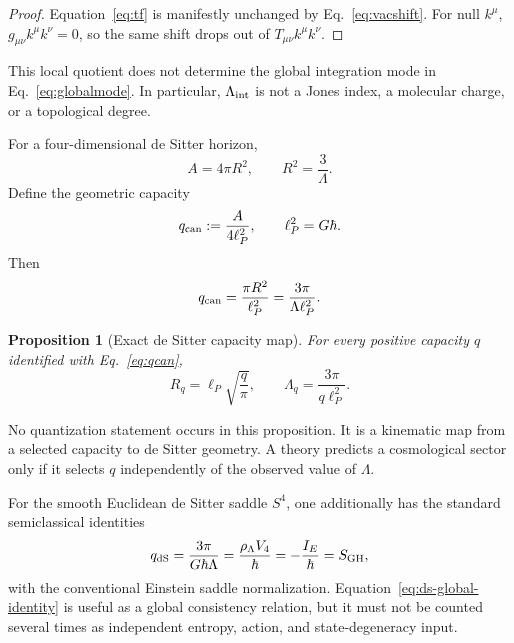 \documentclass[aps,prd,preprint,nofootinbib,superscriptaddress]{revtex4-2}
\newtheorem{proposition}[theorem]{Proposition}
\theoremstyle{definition}
\theoremstyle{remark}
\begin{document}
\begin{proof}
Equation~\eqref{eq:tf} is manifestly unchanged by Eq.~\eqref{eq:vacshift}.  For null $k^\mu$, $g_{\mu\nu}k^\mu k^\nu=0$, so the same shift drops out of $T_{\mu\nu}k^\mu k^\nu$.
\end{proof}

This local quotient does not determine the global integration mode in Eq.~\eqref{eq:globalmode}.  In particular, $\Lambda_{\rm int}$ is not a Jones index, a molecular charge, or a topological degree.

For a four-dimensional de Sitter horizon,
\begin{equation}
A=4\pi R^2,\qquad R^2=\frac3\Lambda.
\label{eq:dsrelations}
\end{equation}
Define the geometric capacity
\begin{equation}
q_{\rm can}:=\frac{A}{4\ell_P^2},
\qquad \ell_P^2=G\hbar.
\label{eq:qcan}
\end{equation}
Then
\begin{equation}
q_{\rm can}=\frac{\pi R^2}{\ell_P^2}
=\frac{3\pi}{\Lambda\ell_P^2}.
\label{eq:dscapacity}
\end{equation}

\begin{proposition}[Exact de Sitter capacity map]
For every positive capacity $q$ identified with Eq.~\eqref{eq:qcan},
\begin{equation}
R_q=\ell_P\sqrt{\frac q\pi},
\qquad
\Lambda_q=\frac{3\pi}{q\ell_P^2}.
\label{eq:dsmap}
\end{equation}
\end{proposition}

No quantization statement occurs in this proposition.  It is a kinematic map from a selected capacity to de Sitter geometry.  A theory predicts a cosmological sector only if it selects $q$ independently of the observed value of $\Lambda$.

For the smooth Euclidean de Sitter saddle $S^4$, one additionally has the standard semiclassical identities
\begin{equation}
q_{\rm dS}
=
\frac{3\pi}{G\hbar\Lambda}
=
\frac{\rho_\Lambda V_4}{\hbar}
=
-\frac{I_E}{\hbar}
=
S_{\rm GH},
\label{eq:ds-global-identity}
\end{equation}
with the conventional Einstein saddle normalization.  Equation~\eqref{eq:ds-global-identity} is useful as a global consistency relation, but it must not be counted several times as independent entropy, action, and state-degeneracy input.
\end{document}
